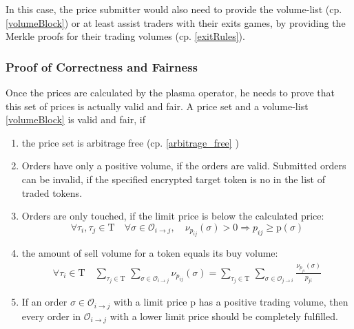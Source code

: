 \documentclass[11pt,parskip=full]{scrartcl}%
\newcommand{\Tau}{\mathrm{T}}
\def\pO{\mathcal{O}}
\def\ra{\rightarrow}
\begin{document}
In this case, the price submitter would also need to provide the volume-list (cp. \ref{volumeBlock}) or at least assist traders with their exits games, by providing the Merkle proofs for their trading volumes (cp. \ref{exitRules}). 

\subsubsection*{Proof of Correctness and Fairness}
\label{proofprices}
Once the prices are calculated by the plasma operator, he needs to prove that this set of prices is actually valid and fair. A price set and a volume-list \ref{volumeBlock} is valid and fair, if

\begin{enumerate}

\item the price set is arbitrage free (cp. \ref{arbitrage_free} )
\item Orders have only a positive volume, if the orders are valid. Submitted orders can be invalid, if the specified encrypted target token is no in the list of traded tokens.
\item Orders are only touched, if the limit price is below the calculated price:\newline
\begin{equation} \forall \tau_i ,\tau_j \in \Tau \quad \forall \sigma \in \pO_{i\ra j}, \quad \nu_{p_{ij}}(\sigma)>0 \Rightarrow p_{ij}\geq \text{p}(\sigma)
\label{limitprice_sat}
\end{equation}
\item the amount of sell volume for a token equals its buy volume: 
\begin{equation}
\begin{split}
\forall \tau_i \in \Tau \quad \sum_{\tau_j\in \Tau} \,
\sum_{ \sigma\in \pO_{i \rightarrow j}} \nu_{p_{ij}}(\sigma) = \sum_{\tau_j\in \Tau} \, \sum_{\sigma\in \pO_{j\rightarrow i}} \frac{\nu_{p_{ji}}(\sigma)}{p_{ji}}
\label{volume_balance}
\end{split}
\end{equation}
\item If an order $\sigma \in \pO_{i\rightarrow j}$ with a limit price p has a positive trading volume, then every order in $\pO_{i\rightarrow j}$ with a lower limit price should be completely fulfilled. 
\end{enumerate}
\end{document}
